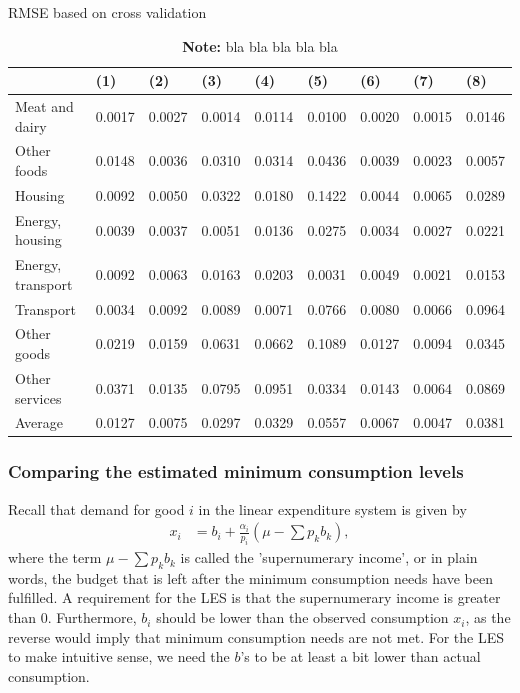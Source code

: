\begin{table}[H]
\caption{RMSE based on cross validation}
\label{tableCV}
\begin{tabular}{@{}lllllllll@{}}
\hline
                  & (1) & (2) & (3)  & (4)& (5)  & (6) & (7) & (8) \\ \hline
Meat and dairy    & 0.0017   & 0.0027       & 0.0014 & 0.0114    & 0.0100 & 0.0020    & 0.0015       & 0.0146           \\
Other foods       & 0.0148   & 0.0036       & 0.0310 & 0.0314    & 0.0436 & 0.0039    & 0.0023       & 0.0057           \\
Housing           & 0.0092   & 0.0050       & 0.0322 & 0.0180    & 0.1422 & 0.0044    & 0.0065       & 0.0289           \\
Energy, housing   & 0.0039   & 0.0037       & 0.0051 & 0.0136    & 0.0275 & 0.0034    & 0.0027       & 0.0221           \\
Energy, transport & 0.0092   & 0.0063       & 0.0163 & 0.0203    & 0.0031 & 0.0049    & 0.0021       & 0.0153           \\
Transport         & 0.0034   & 0.0092       & 0.0089 & 0.0071    & 0.0766 & 0.0080    & 0.0066       & 0.0964           \\
Other goods       & 0.0219   & 0.0159       & 0.0631 & 0.0662    & 0.1089 & 0.0127    & 0.0094       & 0.0345           \\
Other services    & 0.0371   & 0.0135       & 0.0795 & 0.0951    & 0.0334 & 0.0143    & 0.0064       & 0.0869           \\ \hline
Average           & 0.0127   & 0.0075       & 0.0297 & 0.0329    & 0.0557 & 0.0067    & 0.0047       & 0.0381           \\ \hline 
\end{tabular}
\captionsetup{singlelinecheck=off,size=scriptsize}
\setlength{\captionmargin}{10pt}
\caption*{
\textbf{Note:} bla bla bla bla bla}
\end{table}

\subsubsection{Comparing the estimated minimum consumption levels}
Recall that demand for good $i$ in the linear expenditure system is given by
\begin{align}
    x_i &= b_i + \frac{\alpha_i}{p_i} \left ( \mu - \sum p_k b_k \right),
\end{align}
where the term $\mu - \sum p_k b_k $ is called the 'supernumerary income', or in plain words, the budget that is left after the minimum consumption needs have been fulfilled. A requirement for the LES is that the supernumerary income is greater than 0. Furthermore, $b_i$ should be lower than the observed consumption $x_i$, as the reverse would imply that minimum consumption needs are not met. For the LES to make intuitive sense, we need the $b$'s to be at least a bit lower than actual consumption. 


